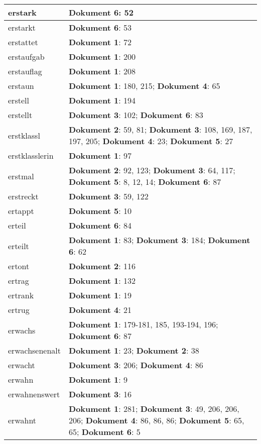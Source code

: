 \documentclass[a5paper]{article}
\begin{document}
\begin{longtable}[l]{|l|p{3in}|}
\hline
erstark & \textbf{Dokument 6}: 52 \\
\hline
erstarkt & \textbf{Dokument 6}: 53 \\
\hline
erstattet & \textbf{Dokument 1}: 72 \\
\hline
erstaufgab & \textbf{Dokument 1}: 200 \\
\hline
erstauflag & \textbf{Dokument 1}: 208 \\
\hline
erstaun & \textbf{Dokument 1}: 180, 215; \textbf{Dokument 4}: 65 \\
\hline
erstell & \textbf{Dokument 1}: 194 \\
\hline
erstellt & \textbf{Dokument 3}: 102; \textbf{Dokument 6}: 83 \\
\hline
erstklassl & \textbf{Dokument 2}: 59, 81; \textbf{Dokument 3}: 108, 169, 187, 197, 205; \textbf{Dokument 4}: 23; \textbf{Dokument 5}: 27 \\
\hline
erstklasslerin & \textbf{Dokument 1}: 97 \\
\hline
erstmal & \textbf{Dokument 2}: 92, 123; \textbf{Dokument 3}: 64, 117; \textbf{Dokument 5}: 8, 12, 14; \textbf{Dokument 6}: 87 \\
\hline
erstreckt & \textbf{Dokument 3}: 59, 122 \\
\hline
ertappt & \textbf{Dokument 5}: 10 \\
\hline
erteil & \textbf{Dokument 6}: 84 \\
\hline
erteilt & \textbf{Dokument 1}: 83; \textbf{Dokument 3}: 184; \textbf{Dokument 6}: 62 \\
\hline
ertont & \textbf{Dokument 2}: 116 \\
\hline
ertrag & \textbf{Dokument 1}: 132 \\
\hline
ertrank & \textbf{Dokument 1}: 19 \\
\hline
ertrug & \textbf{Dokument 4}: 21 \\
\hline
erwachs & \textbf{Dokument 1}: 179-181, 185, 193-194, 196; \textbf{Dokument 6}: 87 \\
\hline
erwachsenenalt & \textbf{Dokument 1}: 23; \textbf{Dokument 2}: 38 \\
\hline
erwacht & \textbf{Dokument 3}: 206; \textbf{Dokument 4}: 86 \\
\hline
erwahn & \textbf{Dokument 1}: 9 \\
\hline
erwahnenswert & \textbf{Dokument 3}: 16 \\
\hline
erwahnt & \textbf{Dokument 1}: 281; \textbf{Dokument 3}: 49, 206, 206, 206; \textbf{Dokument 4}: 86, 86, 86; \textbf{Dokument 5}: 65, 65; \textbf{Dokument 6}: 5 \\

\end{longtable}
\end{document}
